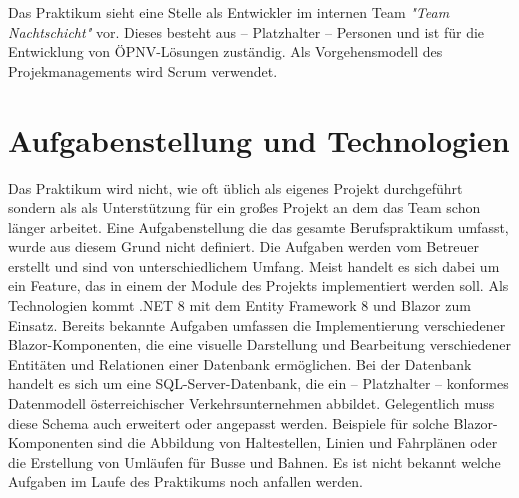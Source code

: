 	Das Praktikum sieht eine Stelle als Entwickler im internen Team \emph{"Team Nachtschicht"} vor. Dieses besteht aus -- Platzhalter -- Personen und ist für die Entwicklung 
	von ÖPNV-Lösungen zuständig. Als Vorgehensmodell des Projekmanagements  wird Scrum verwendet. 
\section{Aufgabenstellung und Technologien}
\label{sec:aufgabenstellung}
	
	Das Praktikum wird nicht, wie oft üblich als eigenes Projekt durchgeführt sondern als als Unterstützung für ein großes Projekt an dem das Team schon länger arbeitet.
	Eine Aufgabenstellung die das gesamte Berufspraktikum umfasst, wurde aus diesem Grund nicht definiert. Die Aufgaben werden vom Betreuer erstellt und sind von unterschiedlichem Umfang.
	Meist handelt es sich dabei um ein Feature, das in einem der Module des Projekts implementiert werden soll.
	Als Technologien kommt .NET 8 mit dem Entity Framework 8 und Blazor zum Einsatz. Bereits bekannte Aufgaben umfassen die Implementierung verschiedener Blazor-Komponenten,
	die eine visuelle Darstellung und Bearbeitung verschiedener Entitäten und Relationen einer Datenbank ermöglichen. Bei der Datenbank handelt es sich um eine SQL-Server-Datenbank,
	die ein -- Platzhalter -- konformes Datenmodell österreichischer Verkehrsunternehmen abbildet. 
	Gelegentlich muss diese Schema auch erweitert oder angepasst werden. Beispiele für solche Blazor-Komponenten sind die Abbildung von Haltestellen, Linien und Fahrplänen oder die 
	Erstellung von Umläufen für Busse und Bahnen. Es ist nicht bekannt welche Aufgaben im Laufe des Praktikums noch anfallen werden.




